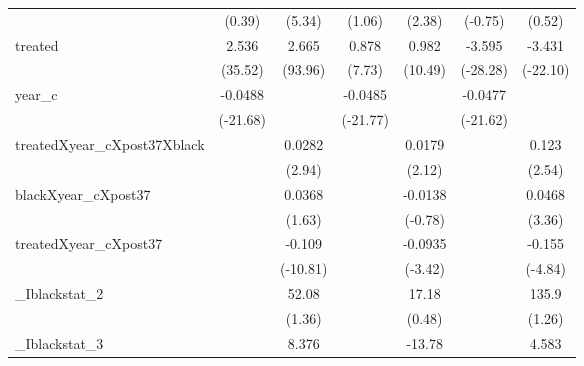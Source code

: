 {\begin{tabular}{l*{6}{c}}
            &      (0.39)         &      (5.34)         &      (1.06)         &      (2.38)         &     (-0.75)         &      (0.52)         \\
[1em]
treated     &       2.536\sym{***}&       2.665\sym{***}&       0.878\sym{***}&       0.982\sym{***}&      -3.595\sym{***}&      -3.431\sym{***}\\
            &     (35.52)         &     (93.96)         &      (7.73)         &     (10.49)         &    (-28.28)         &    (-22.10)         \\
[1em]
year\_c      &     -0.0488\sym{***}&                     &     -0.0485\sym{***}&                     &     -0.0477\sym{***}&                     \\
            &    (-21.68)         &                     &    (-21.77)         &                     &    (-21.62)         &                     \\
[1em]
treatedXyear\_cXpost37Xblack&                     &      0.0282\sym{**} &                     &      0.0179\sym{*}  &                     &       0.123\sym{*}  \\
            &                     &      (2.94)         &                     &      (2.12)         &                     &      (2.54)         \\
[1em]
blackXyear\_cXpost37&                     &      0.0368         &                     &     -0.0138         &                     &      0.0468\sym{**} \\
            &                     &      (1.63)         &                     &     (-0.78)         &                     &      (3.36)         \\
[1em]
treatedXyear\_cXpost37&                     &      -0.109\sym{***}&                     &     -0.0935\sym{**} &                     &      -0.155\sym{***}\\
            &                     &    (-10.81)         &                     &     (-3.42)         &                     &     (-4.84)         \\
[1em]
\_Iblackstat\_2&                     &       52.08         &                     &       17.18         &                     &       135.9         \\
            &                     &      (1.36)         &                     &      (0.48)         &                     &      (1.26)         \\
[1em]
\_Iblackstat\_3&                     &       8.376         &                     &      -13.78         &                     &       4.583         \\

\end{tabular}}
